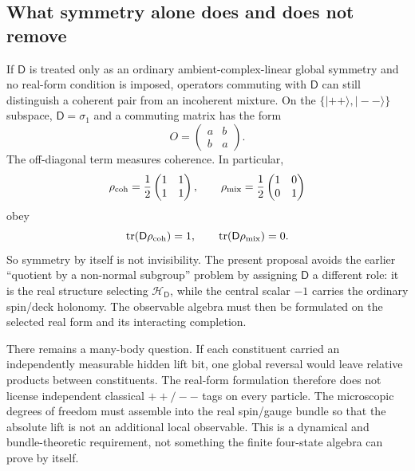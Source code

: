 \documentclass[11pt]{article}
\theoremstyle{definition}\newtheorem{definition}[theorem]{Definition}
\theoremstyle{remark}\newtheorem{remark}[theorem]{Remark}\newtheorem{conjecture}[theorem]{Conjecture}
\begin{document}
\subsection{What symmetry alone does and does not remove}\label{subsec:symmetrynotenough}
If $\mathsf D$ is treated only as an ordinary ambient-complex-linear global symmetry and no real-form condition is imposed, operators commuting with $\mathsf D$ can still distinguish a coherent pair from an incoherent mixture. On the $\{|++\rangle,|--\rangle\}$ subspace, $\mathsf D=\sigma_1$ and a commuting matrix has the form
\begin{equation}
 O=\begin{pmatrix}a&b\\b&a\end{pmatrix}.
\end{equation}
The off-diagonal term measures coherence. In particular,
\begin{equation}
 \rho_{\rm coh}=\frac12\begin{pmatrix}1&1\\1&1\end{pmatrix},\qquad
 \rho_{\rm mix}=\frac12\begin{pmatrix}1&0\\0&1\end{pmatrix}
\end{equation}
obey
\begin{equation}
 \operatorname{tr}(\mathsf D\rho_{\rm coh})=1,\qquad
 \operatorname{tr}(\mathsf D\rho_{\rm mix})=0.
\end{equation}
So symmetry by itself is not invisibility. The present proposal avoids the earlier ``quotient by a non-normal subgroup'' problem by assigning $\mathsf D$ a different role: it is the real structure selecting $\mathcal H_{\mathsf D}$, while the central scalar $-1$ carries the ordinary spin/deck holonomy. The observable algebra must then be formulated on the selected real form and its interacting completion.

There remains a many-body question. If each constituent carried an independently measurable hidden lift bit, one global reversal would leave relative products between constituents. The real-form formulation therefore does not license independent classical $++/--$ tags on every particle. The microscopic degrees of freedom must assemble into the real spin/gauge bundle so that the absolute lift is not an additional local observable. This is a dynamical and bundle-theoretic requirement, not something the finite four-state algebra can prove by itself.
\end{document}
